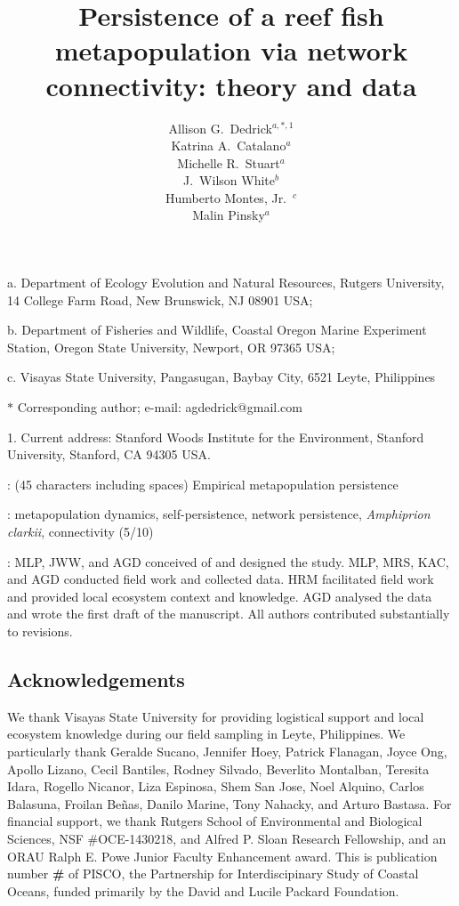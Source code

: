 \documentclass[12pt, oneside]{article}   	%
\author{}
\author{Allison G.\ Dedrick$^{a, \ast, 1}$ \\
Katrina A.\ Catalano$^a$ \\
Michelle R.\ Stuart$^a$ \\
J.\ Wilson White$^b$ \\
Humberto Montes, Jr.\ $^c$ \\
Malin Pinsky$^a$}
\title{Persistence of a reef fish metapopulation via network connectivity: theory and data}
\date{}
\begin{document}
\renewcommand{\topfraction}{0.95}
\maketitle{}

\noindent{} a. Department of Ecology Evolution and Natural Resources, Rutgers University, 14 College Farm Road, New Brunswick, NJ 08901 USA;

\noindent{} b. Department of Fisheries and Wildlife, Coastal Oregon Marine Experiment Station, Oregon State University, Newport, OR 97365 USA;

\noindent{} c. Visayas State University, Pangasugan, Baybay City, 6521 Leyte, Philippines

\noindent{} $\ast$ Corresponding author; e-mail: agdedrick@gmail.com

\noindent{} 1. Current address: Stanford Woods Institute for the Environment, Stanford University, Stanford, CA 94305 USA.


: (45 characters including spaces) Empirical metapopulation persistence

: metapopulation dynamics, self-persistence, network persistence, \textit{Amphiprion clarkii}, connectivity (5/10)

: MLP, JWW, and AGD conceived of and designed the study. MLP, MRS, KAC, and AGD conducted field work and collected data. HRM facilitated field work and provided local ecosystem context and knowledge. AGD analysed the data and wrote the first draft of the manuscript. All authors contributed substantially to revisions. 


\subsection*{Acknowledgements}
We thank Visayas State University for providing logistical support and local ecosystem knowledge during our field sampling in Leyte, Philippines. We particularly thank Geralde Sucano, Jennifer Hoey, Patrick Flanagan, Joyce Ong, Apollo Lizano, Cecil Bantiles, Rodney Silvado, Beverlito Montalban, Teresita Idara, Rogello Nicanor, Liza Espinosa, Shem San Jose, Noel Alquino, Carlos Balasuna, Froilan Beñas, Danilo Marine, Tony Nahacky, and Arturo Bastasa. For financial support, we thank Rutgers School of Environmental and Biological Sciences, NSF \#OCE-1430218, and Alfred P. Sloan Research Fellowship, and an ORAU Ralph E. Powe Junior Faculty Enhancement award. This is publication number \textbf{\#} of PISCO, the Partnership for Interdiscipinary Study of Coastal Oceans, funded primarily by the David and Lucile Packard Foundation.
\end{document}
